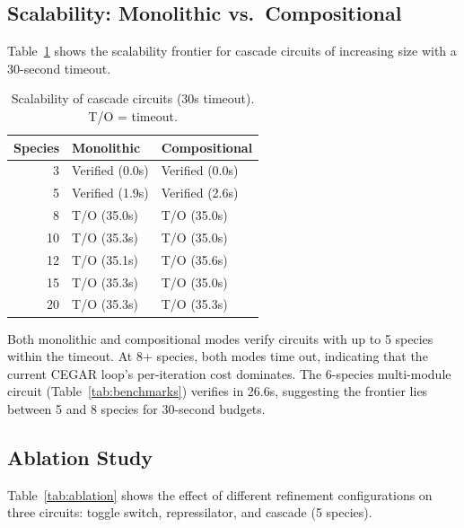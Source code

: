 \documentclass[11pt]{article}
\begin{document}
\subsection{Scalability: Monolithic vs.\ Compositional}

Table~\ref{tab:scalability} shows the scalability frontier for
cascade circuits of increasing size with a 30-second timeout.

\begin{table}[t]
\centering
\caption{Scalability of cascade circuits (30s timeout). T/O = timeout.}
\label{tab:scalability}
\small
\begin{tabular}{rll}
\toprule
\textbf{Species} & \textbf{Monolithic} & \textbf{Compositional} \\
\midrule
 3 & Verified (0.0s)  & Verified (0.0s) \\
 5 & Verified (1.9s)  & Verified (2.6s) \\
 8 & T/O (35.0s)      & T/O (35.0s) \\
10 & T/O (35.3s)      & T/O (35.0s) \\
12 & T/O (35.1s)      & T/O (35.6s) \\
15 & T/O (35.3s)      & T/O (35.0s) \\
20 & T/O (35.3s)      & T/O (35.3s) \\
\bottomrule
\end{tabular}
\end{table}

Both monolithic and compositional modes verify circuits with up to 5
species within the timeout. At 8+ species, both modes time out,
indicating that the current CEGAR loop's per-iteration cost dominates.
The 6-species multi-module circuit (Table~\ref{tab:benchmarks})
verifies in 26.6s, suggesting the frontier lies between 5 and 8
species for 30-second budgets.

\subsection{Ablation Study}

Table~\ref{tab:ablation} shows the effect of different refinement
configurations on three circuits: toggle switch, repressilator, and
cascade (5 species).
\end{document}
